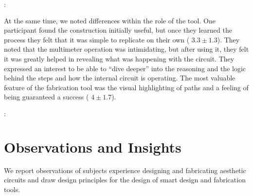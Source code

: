 \documentclass{sigchi}
\begin{document}
  \begin{myquote}
   \vspace{-2pt}
    :
    \vspace{-2pt}
  \end{myquote}

  At the same time, we noted differences within the role of the tool. One participant found the construction initially useful, but once they learned the process they felt that it was simple to replicate on their own ( $3.3 \pm 1.3$).   They noted that the multimeter operation was intimidating, but after using it, they felt it was greatly helped in revealing what was happening with the circuit. They expressed an interest to be able to ``dive deeper'' into the reasoning and the logic behind the steps and how the internal circuit is operating. The most valuable feature of the fabrication tool was the visual highlighting of paths and a feeling of being guaranteed a success ( $4 \pm 1.7$). 

  \begin{myquote}
   \vspace{-2pt}
    :
    \vspace{-2pt}
  \end{myquote}




% 
  
  

\section{Observations and Insights}
  We report observations of subjects experience designing and fabricating aesthetic circuits and draw design principles for the design of smart design and fabrication tools. 
  
\end{document}

